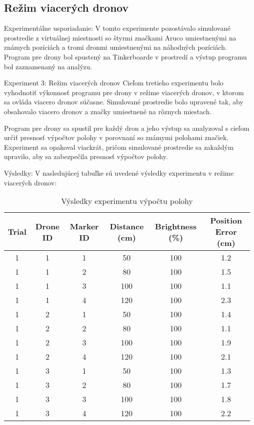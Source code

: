 \subsection{Režim viacerých dronov}
Experimentálne usporiadanie:
V tomto experimente pozostávalo simulované prostredie z virtuálnej miestnosti so štyrmi značkami Aruco umiestnenými na známych pozíciách a tromi dronmi umiestnenými na náhodných pozíciách. Program pre drony bol spustený na Tinkerboarde v prostredí a výstup programu bol zaznamenaný na analýzu.

Experiment 3: Režim viacerých dronov
Cieľom tretieho experimentu bolo vyhodnotiť výkonnosť programu pre drony v režime viacerých dronov, v ktorom sa ovláda viacero dronov súčasne. Simulované prostredie bolo upravené tak, aby obsahovalo viacero dronov a značky umiestnené na rôznych miestach.

Program pre drony sa spustil pre každý dron a jeho výstup sa analyzoval s cieľom určiť presnosť výpočtov polohy v porovnaní so známymi polohami značiek. Experiment sa opakoval viackrát, pričom simulované prostredie sa zakaždým upravilo, aby sa zabezpečila presnosť výpočtov polohy.

Výsledky:
V nasledujúcej tabuľke sú uvedené výsledky experimentu v režime viacerých dronov:

\begin{table}[h!] 
    \centering
        \begin{tabular}{|c| c| c| c| c| c |} 
        \hline
        Trial & Drone ID & Marker ID & Distance (cm) & Brightness (\%)& Position Error (cm) \\
        \hline\hline
        1 & 1 & 1 & 50 & 100 & 1.2 \\ 
        1 & 1 & 2 & 80 & 100 & 1.5 \\ 
        1 & 1 & 3 & 100 & 100 & 1.1 \\ 
        1 & 1 & 4 & 120 & 100 & 2.3 \\ 
        1 & 2 & 1 & 50 & 100 & 1.4 \\ 
        1 & 2 & 2 & 80 & 100 & 1.1 \\ 
        1 & 2 & 3 & 100 & 100 & 1.9 \\ 
        1 & 2 & 4 & 120 & 100 & 2.1 \\ 
        1 & 3 & 1 & 50 & 100 & 1.3 \\ 
        1 & 3 & 2 & 80 & 100 & 1.7 \\ 
        1 & 3 & 3 & 100 & 100 & 1.8 \\ 
        1 & 3 & 4 & 120 & 100 & 2.2 \\ 
        \hline
       \end{tabular}
       \caption{Výsledky experimentu výpočtu polohy}
        \label{table:1}
\end{table}

